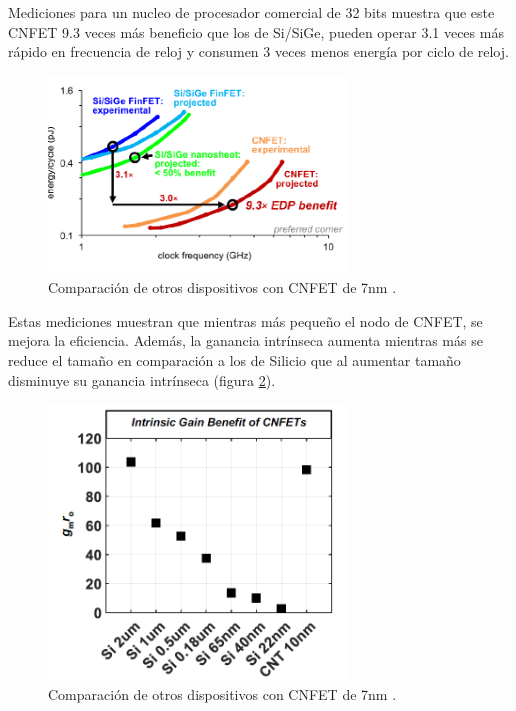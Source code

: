 \documentclass[conference]{IEEEtran} %
\begin{document}
Mediciones para un nucleo de procesador comercial de 32 bits muestra que este CNFET 9.3 veces más beneficio que los de Si/SiGe, pueden operar 3.1 veces más rápido en frecuencia de reloj y consumen 3 veces menos energía por ciclo de reloj.

\begin{figure}
	\centering
	\includegraphics[width=8cm]{IMAGENES/img15}
	\caption{Comparación de otros dispositivos con CNFET de 7nm \cite{UnderstandingEnergyEfficiency2018} .}
	\label{img15}
\end{figure}

Estas mediciones muestran que mientras más pequeño el nodo de CNFET, se mejora la eficiencia. Además, la ganancia intrínseca aumenta mientras más se reduce el tamaño \cite{CarbonNanotubeCMOS2019} en comparación a los de Silicio que al aumentar tamaño disminuye su ganancia intrínseca (figura \ref{img19}).



\begin{figure}
	\centering
	\includegraphics[width=8cm]{IMAGENES/img19}
	\caption{Comparación de otros dispositivos con CNFET de 7nm \cite{UnderstandingEnergyEfficiency2018} .}
	\label{img19}
\end{figure}



\end{document}
